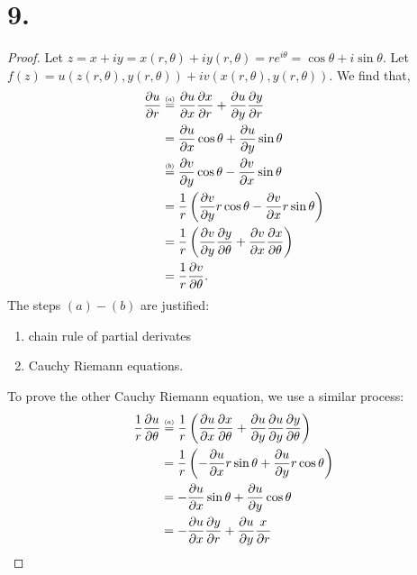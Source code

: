 \documentclass{article}
\newcommand\numeq[1]%
  {\stackrel{\scriptscriptstyle(\mkern-1.5mu#1\mkern-1.5mu)}{=}}
\begin{document}
\section*{9.}
\begin{proof}
    Let $z = x + iy = x(r, \theta) + iy(r, \theta) = re^{i \theta} = \cos \theta + i \sin \theta$. Let $f(z) = u(z(r, \theta), y(r, \theta)) + iv(x(r, \theta), y(r, \theta))$. We find that, 
    \begin{align*}
       \frac{\partial u}{\partial r} &\numeq{a} \frac{\partial u}{\partial x}\frac{\partial x}{\partial r} + \frac{\partial u}{\partial y}\frac{\partial y}{\partial r}  \\
   &= \frac{\partial u}{\partial x}\cos \theta + \frac{\partial u}{\partial y}\sin \theta \\
   &\numeq{b} \frac{\partial v}{\partial y}\cos \theta - \frac{\partial v}{\partial x}\sin \theta \\
   &= \frac{1}{r} \left(\frac{\partial v}{\partial y}r \cos \theta - \frac{\partial v}{\partial x}r \sin \theta \right) \\
   &= \frac{1}{r} \left(\frac{\partial v}{\partial y}\frac{\partial y}{ \partial \theta} + \frac{\partial v}{\partial x}\frac{\partial x}{\partial \theta}\right) \\
   &= \frac{1}{r} \frac{\partial v}{\partial \theta}. 
   \end{align*}
The steps $(a)-(b)$ are justified: 
\begin{enumerate}[label=(\alph*),leftmargin=2\parindent]
    \item chain rule of partial derivates
    \item Cauchy Riemann equations.
\end{enumerate}
To prove the other Cauchy Riemann equation, we use a similar process:
\begin{align*}
   \frac{1}{r}\frac{\partial u}{\partial \theta} &\numeq{a} \frac{1}{r} \left(\frac{\partial u}{\partial x} \frac{\partial x}{\partial \theta}+ \frac{\partial u}
   {\partial y}\frac{\partial u}{\partial y}\frac{\partial y}{\partial \theta}\right) \\
   &= \frac{1}{r} \left(-\frac{\partial u}{\partial x} r \sin \theta + \frac{\partial u}{\partial y} r \cos \theta \right) \\
   &= - \frac{\partial u}{\partial x} \sin \theta + \frac{\partial u}{\partial y} \cos \theta \\
   &= -\frac{\partial u}{\partial x}\frac{\partial y}{\partial r} + \frac{\partial u}{\partial y} \frac{x}{\partial r} \\

\end{align*}
\end{proof}
\end{document}
